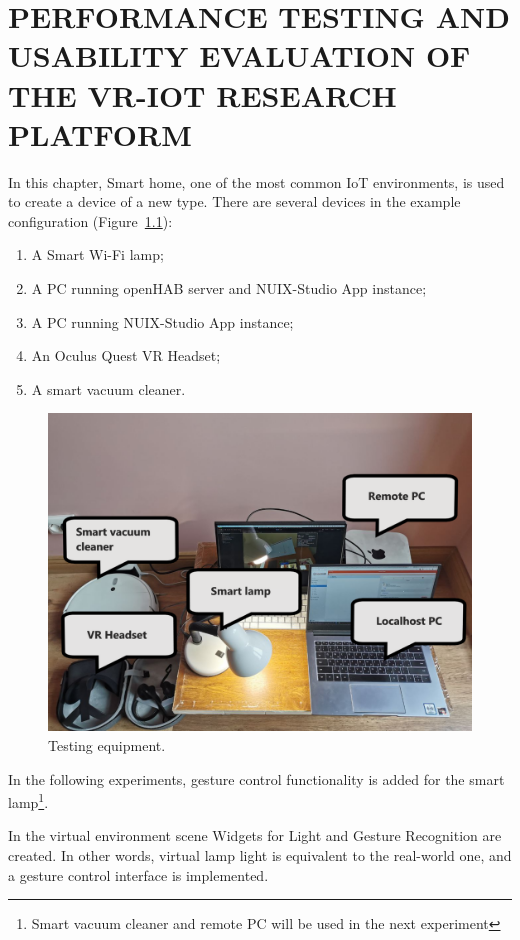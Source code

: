 
\chapter{PERFORMANCE TESTING AND USABILITY EVALUATION OF THE VR-IOT RESEARCH PLATFORM}

In this chapter, Smart home, one of the most common IoT environments, is used to create a device of a new type. There are several devices in the example configuration (Figure~\ref{fig:TestingEquipment-figure}):
\begin{enumerate}
    \item A Smart Wi-Fi lamp;
    \item A PC running openHAB server and NUIX-Studio App instance;
    \item A PC running NUIX-Studio App instance;
    \item An Oculus Quest VR Headset;
    \item A smart vacuum cleaner.
\end{enumerate}

\begin{figure}
  \centering
  \includegraphics[width = 0.9 \linewidth]{figures/TestingEquipment.png}
  \caption{Testing equipment.}
  \label{fig:TestingEquipment-figure}
\end{figure}

In the following experiments, gesture control functionality is added for the smart lamp\footnote{Smart vacuum cleaner and remote PC will be used in the next experiment}.

In the virtual environment scene Widgets for Light and Gesture Recognition are created. In other words, virtual lamp light is equivalent to the real-world one, and a gesture control interface is implemented.

